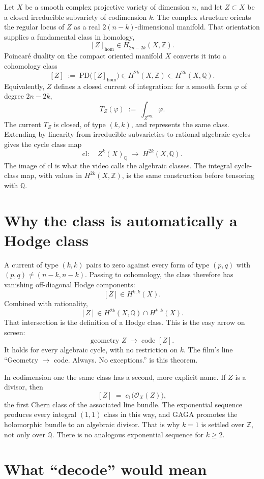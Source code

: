 \documentclass[11pt,a4paper]{article}
\newcommand{\Q}{\mathbb{Q}}
\newcommand{\Z}{\mathbb{Z}}
\begin{document}
Let \(X\) be a smooth complex projective variety of dimension \(n\), and let \(Z\subset X\) be a closed irreducible subvariety of codimension \(k\). The complex structure orients the regular locus of \(Z\) as a real \(2(n-k)\)-dimensional manifold. That orientation supplies a fundamental class in homology,
\[
[Z]_{\mathrm{hom}}\in H_{2n-2k}(X,\Z).
\]
Poincar\'e duality on the compact oriented manifold \(X\) converts it into a cohomology class
\[
[Z]\;:=\;\mathrm{PD}\bigl([Z]_{\mathrm{hom}}\bigr)\in H^{2k}(X,\Z)\subset H^{2k}(X,\Q).
\]
Equivalently, \(Z\) defines a closed current of integration: for a smooth form \(\varphi\) of degree \(2n-2k\),
\[
T_Z(\varphi)\;:=\;\int_{Z^{\mathrm{reg}}}\varphi.
\]
The current \(T_Z\) is closed, of type \((k,k)\), and represents the same class. Extending by linearity from irreducible subvarieties to rational algebraic cycles gives the cycle class map
\[
\mathrm{cl}\colon\quad Z^k(X)_{\Q}\;\longrightarrow\; H^{2k}(X,\Q).
\]
The image of \(\mathrm{cl}\) is what the video calls the algebraic classes. The integral cycle-class map, with values in \(H^{2k}(X,\Z)\), is the same construction before tensoring with \(\Q\).

\section*{Why the class is automatically a Hodge class}

A current of type \((k,k)\) pairs to zero against every form of type \((p,q)\) with \((p,q)\neq(n-k,n-k)\). Passing to cohomology, the class therefore has vanishing off-diagonal Hodge components:
\[
[Z]\in H^{k,k}(X).
\]
Combined with rationality,
\[
[Z]\in H^{2k}(X,\Q)\cap H^{k,k}(X).
\]
That intersection is the definition of a Hodge class. This is the easy arrow on screen:
\[
\text{geometry }Z\;\longrightarrow\;\text{code }[Z].
\]
It holds for every algebraic cycle, with no restriction on \(k\). The film's line ``Geometry \(\to\) code. Always. No exceptions.'' is this theorem.

In codimension one the same class has a second, more explicit name. If \(Z\) is a divisor, then
\[
[Z]\;=\;c_1\bigl(\mathcal{O}_X(Z)\bigr),
\]
the first Chern class of the associated line bundle. The exponential sequence produces every integral \((1,1)\) class in this way, and GAGA promotes the holomorphic bundle to an algebraic divisor. That is why \(k=1\) is settled over \(\Z\), not only over \(\Q\). There is no analogous exponential sequence for \(k\ge 2\).

\section*{What ``decode'' would mean}
\end{document}
